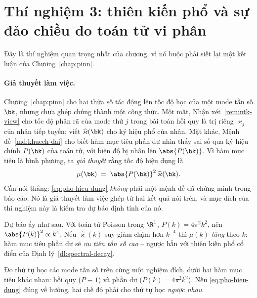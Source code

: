 \section{Thí nghiệm 3: thiên kiến phổ và sự đảo chiều do toán tử vi phân}
\label{sec:tn3}
 
Đây là thí nghiệm quan trọng nhất của chương, vì nó buộc phải siết lại một kết
luận của Chương~\ref{chap:pinn}.
 
\paragraph{Giả thuyết làm việc.}
Chương~\ref{chap:pinn} cho hai thừa số tác động lên tốc độ học của một mode tần
số $\bk$, nhưng chưa ghép chúng thành một công thức. Một mặt,
Nhận xét~\ref{rem:ntk-view} cho tốc độ phân rã của mode thứ $j$ trong bài toán
hồi quy là trị riêng $\varkappa_j$ của nhân tiếp tuyến; viết
$\widehat{\varkappa}(\bk)$ cho ký hiệu phổ của nhân. Mặt khác,
Mệnh đề~\ref{md:khuech-dai} cho biết hàm mục tiêu phần dư nhìn thấy sai số qua ký
hiệu chính $P(\bk)$ của toán tử, với biên độ bị nhân lên $\abs{P(\bk)}$. Vì hàm mục tiêu là bình phương, ta \emph{giả thuyết} rằng tốc độ hiệu dụng là
\begin{equation}
\mu(\bk) \;=\; \abs{P(\bk)}^{2}\,\widehat{\varkappa}(\bk).
\label{eq:pho-hieu-dung}
\end{equation}
Cần nói thẳng: \eqref{eq:pho-hieu-dung} \emph{không} phải một mệnh đề đã chứng
minh trong báo cáo. Nó là giả thuyết làm việc ghép từ hai kết quả nói trên, và
mục đích của thí nghiệm này là kiểm tra dự báo định tính của nó.
 
Dự báo ấy như sau. Với toán tử Poisson trong $\R^1$, $P(k) = 4\pi^2k^2$, nên
$\abs{P(k)}^{2} \propto k^{4}$. Nếu $\widehat{\varkappa}(k)$ suy giảm chậm hơn
$k^{-4}$ thì $\mu(k)$ \emph{tăng} theo $k$: hàm mục tiêu phần dư sẽ \emph{ưu tiên
tần số cao} -- ngược hẳn với thiên kiến phổ cổ điển của
Định lý~\ref{dl:spectral-decay}.
 
\begin{thinghiem}
\label{tn:pho}
Đo thứ tự học các mode tần số trên cùng một nghiệm đích, dưới hai hàm mục tiêu
khác nhau: hồi quy ($P \equiv 1$) và phần dư ($P(k) = 4\pi^2k^2$). Nếu
\eqref{eq:pho-hieu-dung} đúng về hướng, hai chế độ phải cho thứ tự học
\emph{ngược nhau}.
\end{thinghiem}
 
